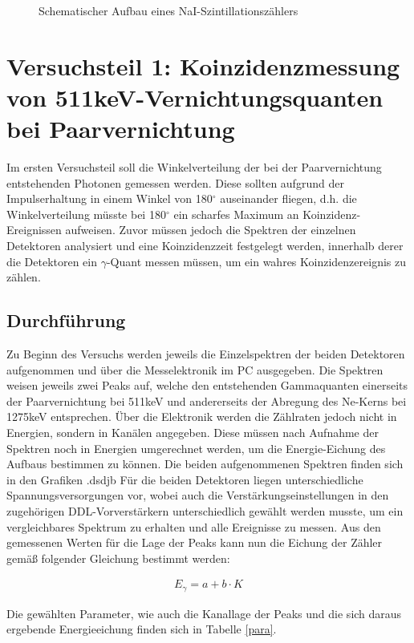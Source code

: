 \documentclass[11pt]{scrartcl}
\begin{document}
\begin{figure}[htbp]  
     
  \caption{Schematischer Aufbau eines NaI-Szintillationszählers}
  \label{PMT3}
\end{figure}

\section{Versuchsteil 1: Koinzidenzmessung von 511keV-Vernichtungsquanten bei Paarvernichtung}
Im ersten Versuchsteil soll die Winkelverteilung der bei der Paarvernichtung entstehenden Photonen gemessen werden. Diese sollten aufgrund der Impulserhaltung in einem Winkel von 180$^\circ$ auseinander fliegen, d.h. die Winkelverteilung müsste bei 180$^\circ$ ein scharfes Maximum an Koinzidenz-Ereignissen aufweisen. Zuvor müssen jedoch die Spektren der einzelnen Detektoren analysiert und eine Koinzidenzzeit festgelegt werden, innerhalb derer die Detektoren ein $\gamma$-Quant messen müssen, um ein wahres Koinzidenzereignis zu zählen. 



\subsection{Durchführung}
Zu Beginn des Versuchs werden jeweils die Einzelspektren der beiden Detektoren aufgenommen und über die Messelektronik im PC ausgegeben. Die Spektren weisen jeweils zwei Peaks auf, welche den entstehenden Gammaquanten einerseits der Paarvernichtung bei 511keV und andererseits der Abregung des Ne-Kerns bei 1275keV entsprechen. Über die Elektronik werden die Zählraten jedoch nicht in Energien, sondern in Kanälen angegeben. Diese müssen nach Aufnahme der Spektren noch in Energien umgerechnet werden, um die Energie-Eichung des Aufbaus bestimmen zu können. Die beiden aufgenommenen Spektren finden sich in den Grafiken .dsdjb
Für die beiden Detektoren liegen unterschiedliche Spannungsversorgungen vor, wobei auch die Verstärkungseinstellungen in den zugehörigen DDL-Vorverstärkern unterschiedlich gewählt werden musste, um ein vergleichbares Spektrum zu erhalten und alle Ereignisse zu messen. Aus den gemessenen Werten für die Lage der Peaks kann nun die Eichung der Zähler gemäß folgender Gleichung bestimmt werden:

\begin{align}
E_\gamma = a + b \cdot K
\end{align}

Die gewählten Parameter, wie auch die Kanallage der Peaks und die sich daraus ergebende Energieeichung finden sich in Tabelle \ref{para}. 
\end{document}
